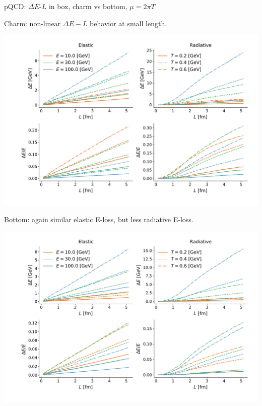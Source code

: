 \documentclass[11pt]{beamer}
\begin{document}
\begin{frame}{pQCD: $\Delta E$-$L$ in box, charm vs bottom, $\mu = 2\pi T$}
\begin{overprint}
Charm: non-linear $\Delta E-L$ behavior at small length.
\begin{center}
\includegraphics[width=\textwidth]{fig/charm-plot/L_Eloss.pdf}
\end{center}
Bottom: again similar elastic E-loss, but less radiative E-loss.
\begin{center}
\includegraphics[width=\textwidth]{fig/bottom-plot/L_Eloss.pdf}
\end{center}
\end{overprint}
\end{frame}
\end{document}
